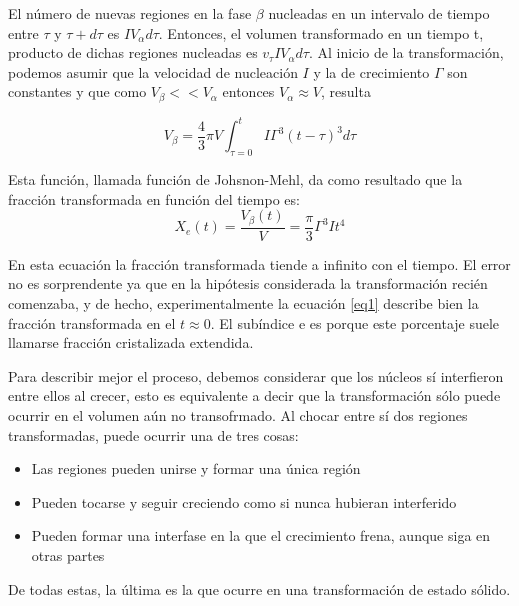 \documentclass{article}
\theoremstyle{definition}
\theoremstyle{remark}
\begin{document}
El número de nuevas regiones en la fase $\beta$ nucleadas en un intervalo de tiempo entre $\tau$ y $\tau + d\tau$ es $IV_\alpha d\tau$. Entonces, el volumen transformado en un tiempo t, producto de dichas regiones nucleadas es $v_\tau IV_\alpha d\tau$. Al inicio de la transformación, podemos asumir que la velocidad de nucleación $I$ y la de crecimiento $\Gamma$ son constantes y que como $V_\beta << V_\alpha$ entonces $V_\alpha \approx V$, resulta

\begin{equation}
\label{integral}
	V_\beta = \frac{4}{3}\pi V \int_{\tau = 0}^{t} I\Gamma^3(t-\tau)^3d\tau
\end{equation}

Esta función, llamada función de Johsnon-Mehl, da como resultado que la fracción transformada en función del tiempo es:
\begin{equation}
\label{eq1}
	X_e(t) = \frac{V_\beta (t)}{V} = \frac{\pi}{3}\Gamma^3 I t^4
\end{equation}

En esta ecuación la fracción transformada tiende a infinito con el tiempo. El error no es sorprendente ya que en la hipótesis considerada la transformación recién comenzaba, y de hecho, experimentalmente la ecuación \ref{eq1} describe bien la fracción transformada en el $t \approx 0$. El subíndice e es porque este porcentaje suele llamarse fracción cristalizada extendida.

Para describir mejor el proceso, debemos considerar que los núcleos sí interfieron entre ellos al crecer, esto es equivalente a decir que la transformación sólo puede ocurrir en el volumen aún no transofrmado. Al chocar entre sí dos regiones transformadas, puede ocurrir una de tres cosas:
\begin{itemize}
\item Las regiones pueden unirse y formar una única región
\item Pueden tocarse y seguir creciendo como si nunca hubieran interferido
\item Pueden formar una interfase en la que el crecimiento frena, aunque siga en otras partes
\end{itemize}

De todas estas, la última es la que ocurre en una transformación de estado sólido.
\end{document}
